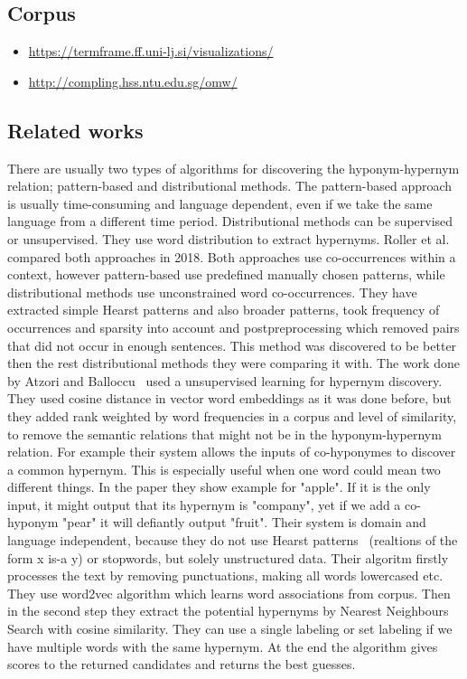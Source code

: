 \documentclass[fleqn,moreauthors,10pt]{ds_report}
\begin{document}
\subsection*{Corpus}
\begin{itemize}
    \item \href{TermFrame}{https://termframe.ff.uni-lj.si/visualizations/}
    \item \href{Wordnet}{http://compling.hss.ntu.edu.sg/omw/}
\end{itemize}


\subsection*{Related works}
There are usually two types of algorithms for discovering the hyponym-hypernym relation; pattern-based and distributional methods. The pattern-based approach is usually time-consuming and language dependent, even if we take the same language from a different time period. Distributional methods can be supervised or unsupervised. They use word distribution to extract hypernyms. Roller et al. \cite{DBLP:journals/corr/abs-1806-03191} compared both approaches in 2018. Both approaches use co-occurrences within a context, however pattern-based use predefined manually chosen patterns, while distributional methods use unconstrained word co-occurrences. They have extracted simple Hearst patterns and also broader patterns, took frequency of occurrences and sparsity into account and postpreprocessing which removed pairs that did not occur in enough sentences. This method was discovered to be better then the rest distributional methods they were comparing it with.  
The work done by Atzori and Balloccu~\cite{Atzori2020} used a unsupervised learning for hypernym discovery. They used cosine distance in vector word embeddings as it was done before, but they added rank weighted by word frequencies in a corpus and level of similarity, to remove the semantic relations that might not be in the hyponym-hypernym relation. For example their system allows the inputs of co-hyponymes to discover a common hypernym. This is especially useful when one word could mean two different things. In the paper they show example for "apple". If it is the only input, it might output that its hypernym is "company", yet if we add a co-hyponym "pear" it will defiantly output "fruit".  Their system is domain and language independent, because they do not use Hearst patterns~\cite{hearst-1992-automatic} (realtions of the form x is-a y) or stopwords, but solely unstructured data. Their algoritm firstly processes the text by removing punctuations, making all words lowercased etc. They use word2vec algorithm which learns word associations from corpus. Then in the second step they extract the potential hypernyms by Nearest Neighbours Search with cosine similarity. They can use a single labeling or set labeling if we have multiple words with the same hypernym. At the end the algorithm gives scores to the returned candidates and returns the best guesses. 
\end{document}
